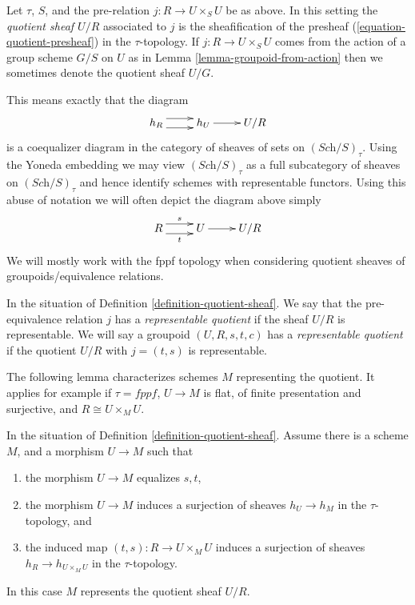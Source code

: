 \begin{definition}
\label{definition-quotient-sheaf}
Let $\tau$, $S$, and the pre-relation $j : R \to U \times_S U$ be as above.
In this setting the {\it quotient sheaf $U/R$} associated
to $j$ is the sheafification of the presheaf
(\ref{equation-quotient-presheaf}) in the $\tau$-topology.
If $j : R \to U \times_S U$ comes from the action of a group scheme
$G/S$ on $U$ as in Lemma \ref{lemma-groupoid-from-action} then we
sometimes denote the quotient sheaf $U/G$.
\end{definition}

\noindent
This means exactly that the diagram
$$
\xymatrix{
h_R \ar@<1ex>[r] \ar@<-1ex>[r] &
h_U \ar[r] &
U/R
}
$$
is a coequalizer diagram in the category of sheaves of sets
on $(\textit{Sch}/S)_\tau$. Using the Yoneda embedding we
may view $(\textit{Sch}/S)_\tau$ as a full subcategory of
sheaves on $(\textit{Sch}/S)_\tau$ and hence identify schemes
with representable functors. Using this abuse of notation
we will often depict the diagram above simply
$$
\xymatrix{
R \ar@<1ex>[r]^s \ar@<-1ex>[r]_t &
U \ar[r] &
U/R
}
$$
We will mostly work with the fppf topology when considering
quotient sheaves of groupoids/equivalence relations.

\begin{definition}
\label{definition-representable-quotient}
In the situation of Definition \ref{definition-quotient-sheaf}.
We say that the pre-equivalence relation $j$ has a
{\it representable quotient} if the sheaf $U/R$ is representable.
We will say a groupoid $(U, R, s, t, c)$ has a
{\it representable quotient}
if the quotient $U/R$ with $j = (t, s)$ is representable.
\end{definition}

\noindent
The following lemma characterizes schemes $M$ representing the quotient.
It applies for example if $\tau = fppf$, $U \to M$ is flat,
of finite presentation and surjective, and $R \cong U \times_M U$.

\begin{lemma}
\label{lemma-criterion-quotient-representable}
In the situation of Definition \ref{definition-quotient-sheaf}.
Assume there is a scheme $M$, and a morphism $U \to M$ such that
\begin{enumerate}
\item the morphism $U \to M$ equalizes $s, t$,
\item the morphism $U \to M$ induces a surjection of sheaves
$h_U \to h_M$ in the $\tau$-topology, and
\item the induced map $(t, s) : R \to U \times_M U$ induces a
surjection of sheaves $h_R \to h_{U \times_M U}$ in the $\tau$-topology.
\end{enumerate}
In this case $M$ represents the quotient sheaf $U/R$.
\end{lemma}

